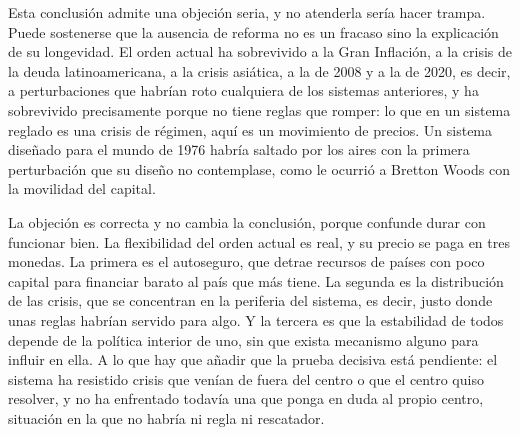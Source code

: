 \documentclass[10pt,a4paper]{article}
\begin{document}
Esta conclusión admite una objeción seria, y no atenderla sería hacer trampa. Puede sostenerse que la ausencia de reforma no es un fracaso sino la explicación de su longevidad. El orden actual ha sobrevivido a la Gran Inflación, a la crisis de la deuda latinoamericana, a la crisis asiática, a la de 2008 y a la de 2020, es decir, a perturbaciones que habrían roto cualquiera de los sistemas anteriores, y ha sobrevivido precisamente porque no tiene reglas que romper: lo que en un sistema reglado es una crisis de régimen, aquí es un movimiento de precios. Un sistema diseñado para el mundo de 1976 habría saltado por los aires con la primera perturbación que su diseño no contemplase, como le ocurrió a Bretton Woods con la movilidad del capital.

La objeción es correcta y no cambia la conclusión, porque confunde durar con funcionar bien. La flexibilidad del orden actual es real, y su precio se paga en tres monedas. La primera es el autoseguro, que detrae recursos de países con poco capital para financiar barato al país que más tiene. La segunda es la distribución de las crisis, que se concentran en la periferia del sistema, es decir, justo donde unas reglas habrían servido para algo. Y la tercera es que la estabilidad de todos depende de la política interior de uno, sin que exista mecanismo alguno para influir en ella. A lo que hay que añadir que la prueba decisiva está pendiente: el sistema ha resistido crisis que venían de fuera del centro o que el centro quiso resolver, y no ha enfrentado todavía una que ponga en duda al propio centro, situación en la que no habría ni regla ni rescatador.
\end{document}
